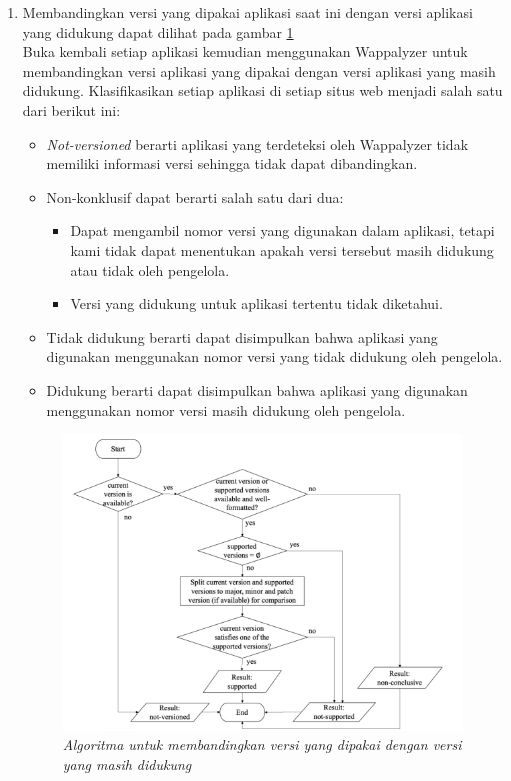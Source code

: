 \begin{enumerate}
    \item Membandingkan versi yang dipakai aplikasi saat ini dengan versi aplikasi yang didukung dapat dilihat pada gambar \ref{fig:apr}\\
    Buka kembali setiap aplikasi kemudian menggunakan Wappalyzer untuk membandingkan versi aplikasi yang dipakai dengan versi aplikasi yang masih didukung. Klasifikasikan setiap aplikasi di setiap situs web menjadi salah satu dari berikut ini:
    \begin{itemize}
        \item \textit{Not-versioned} berarti aplikasi yang terdeteksi oleh Wappalyzer tidak memiliki informasi versi sehingga tidak dapat dibandingkan.
        \item Non-konklusif dapat berarti salah satu dari dua:
        \begin{itemize}
            \item Dapat mengambil nomor versi yang digunakan dalam aplikasi, tetapi kami tidak dapat menentukan apakah versi tersebut masih didukung atau tidak oleh pengelola.
            \item Versi yang didukung untuk aplikasi tertentu tidak diketahui.
        \end{itemize}
        \item Tidak didukung berarti dapat disimpulkan bahwa aplikasi yang digunakan menggunakan nomor versi yang tidak didukung oleh pengelola.
        \item Didukung berarti dapat disimpulkan bahwa aplikasi yang digunakan menggunakan nomor versi masih didukung oleh pengelola.
    \end{itemize}
    \begin{figure}[H]
	\centering  
	\includegraphics[scale=0.9]{Gambar/compare_version.PNG}  
	\caption{\textit{Algoritma untuk membandingkan versi yang dipakai dengan versi yang masih didukung}} 
	\label{fig:apr} 
\end{figure}
\end{enumerate}



